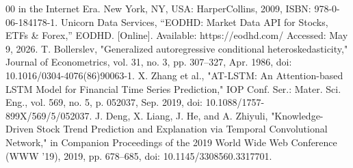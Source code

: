 \documentclass[conference]{IEEEtran}
\begin{document}
\begin{thebibliography}{00}
{    in the Internet Era}. New York, NY, USA: HarperCollins, 2009,
    ISBN: 978-0-06-184178-1.
    Unicorn Data Services, ``EODHD: Market Data API for Stocks, ETFs
    \& Forex,'' EODHD. [Online]. Available: https://eodhd.com/
    Accessed: May 9, 2026.
     T. Bollerslev, "Generalized autoregressive conditional heteroskedasticity," Journal of Econometrics, vol. 31, no. 3, pp. 307–327, Apr. 1986, doi: 10.1016/0304-4076(86)90063-1.
     X. Zhang et al., "AT-LSTM: An Attention-based LSTM Model for Financial Time Series Prediction," IOP Conf. Ser.: Mater. Sci. Eng., vol. 569, no. 5, p. 052037, Sep. 2019, doi: 10.1088/1757-899X/569/5/052037.
     J. Deng, X. Liang, J. He, and A. Zhiyuli, "Knowledge-Driven Stock Trend Prediction and Explanation via Temporal Convolutional Network," in Companion Proceedings of the 2019 World Wide Web Conference (WWW '19), 2019, pp. 678–685, doi: 10.1145/3308560.3317701.

\end{thebibliography}
\end{document}
